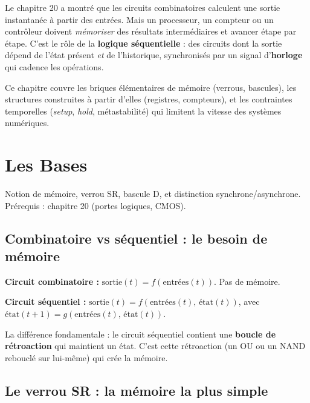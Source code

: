 \documentclass[12pt,a4paper,twoside]{book}
\begin{document}
\vspace{0.5cm}

Le chapitre 20 a montré que les circuits combinatoires calculent une sortie instantanée à partir des entrées. Mais un processeur, un compteur ou un contrôleur doivent \textit{mémoriser} des résultats intermédiaires et avancer étape par étape. C'est le rôle de la \textbf{logique séquentielle} : des circuits dont la sortie dépend de l'état présent \textit{et} de l'historique, synchronisés par un signal d'\textbf{horloge} qui cadence les opérations.

Ce chapitre couvre les briques élémentaires de mémoire (verrous, bascules), les structures construites à partir d'elles (registres, compteurs), et les contraintes temporelles (\textit{setup}, \textit{hold}, métastabilité) qui limitent la vitesse des systèmes numériques.

\section{Les Bases}

\begin{bases}
Notion de mémoire, verrou SR, bascule D, et distinction synchrone/asynchrone. Prérequis : chapitre 20 (portes logiques, CMOS).
\end{bases}

\subsection{Combinatoire vs séquentiel : le besoin de mémoire}

\begin{formule}
\textbf{Circuit combinatoire :} $\text{sortie}(t) = f(\text{entrées}(t))$. Pas de mémoire.

\textbf{Circuit séquentiel :} $\text{sortie}(t) = f(\text{entrées}(t),\, \text{état}(t))$, avec $\text{état}(t+1) = g(\text{entrées}(t),\, \text{état}(t))$.

La différence fondamentale : le circuit séquentiel contient une \textbf{boucle de rétroaction} qui maintient un état. C'est cette rétroaction (un OU ou un NAND rebouclé sur lui-même) qui crée la mémoire.
\end{formule}

\subsection{Le verrou SR : la mémoire la plus simple}
\end{document}

